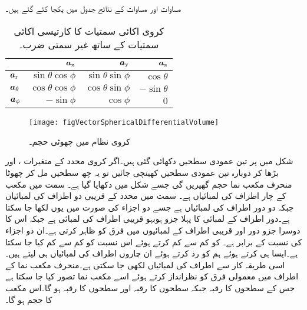 مساوات   اور مساوات   کے نتائج جدول  میں یکجا کئے گئے ہیں۔ 
\begin{table}
\caption{کروی  اکائی سمتیات کا کارتیسی اکائی سمتیات کے ساتھ غیر سمتی ضرب۔}
\centering
\begin{tabular}{l | r r r}
 & ${\boldsymbol{a}}_{\textup{x}}$ & ${\boldsymbol{a}}_{\textup{y}}$ & ${\boldsymbol{a}}_{\textup{z}}$ \\
\hline
${\boldsymbol{a}}_{\textup{r}}$ & $\sin \theta \cos \phi$ & $\sin \theta \sin \phi$& $\cos \theta$\\
${\boldsymbol{a}}_{\theta}$ &$\cos \theta \cos \phi$ &$ \cos \theta \sin \phi$ &$ -\sin \theta$\\
${\boldsymbol{a}}_{\phi}$ & $-\sin \phi$ &$ \cos \phi$ &$0$
\end{tabular}
\label{جدول_سمتیہ_کروی_کارتیسی_اکائی_غیر-سمتی_ضرب}
\end{table}
%
\begin{figure}
\centering
\texttt{[image: figVectorSphericalDifferentialVolume]}
\caption{کروی نظام میں چھوٹی حجم۔}
\label{شکل_سمتیہ_کروی_چھوٹی_حجم}
\end{figure}

شکل  میں  پر تین عمودی سطحیں دکھائی گئی ہیں۔اگر کروی محدد کے متغیرات ،  اور  بڑھا کر دوبارہ تین عمودی سطحیں کھینچی جائیں تو یہ چھ سطحیں مل کر چھوٹا منحرف مکعب نما حجم گھیریں گی جسے شکل  میں دکھایا گیا ہے۔ سمت میں مکعب کے چار اطراف کی لمبائیاں  ہے۔ سمت میں  محدد کے قریبی دو اطراف کی لمبائیاں  جبکہ دو دور اطراف کی لمبائیاں  ہے جسے دو اجزاء کی صورت میں یوں   لکھا جا سکتا ہے۔دور اطراف کے لمبائی کا پہلا جزو ہوبہو قریبی اطراف کی لمبائی ہے جبکہ اس کا دوسرا جزو دور اور قریبی اطراف کے لمبائیوں میں فرق کو ظاہر کرتی ہے۔ان دو اجزاء کی نسبت   کے برابر ہے۔ کو کم سے کم کرتے ہوئے اس نسبت کو کم سے کم کیا جا سکتا  ہے۔ایسا ہی کرتے ہوئے ہم  کو رد کرتے ہوئے ان چاروں اطراف کی لمبائیاں  ہی لیتے ہیں۔اسی طریقہ کار سے   اطراف کی لمبائیاں   لکھی جا سکتی ہے۔منحرف مکعب نما کے اطراف میں معمولی فرق کو نظرانداز کرتے ہوئے اسے مکعب نما تصور کیا جا سکتا ہے جس کے  سطحوں کا رقبہ  جبکہ  سطحوں کا رقبہ  اور  سطحوں کا رقبہ    ہو گا۔اس مکعب کا حجم  ہو گا۔


